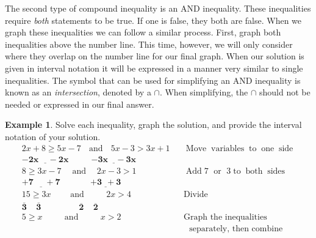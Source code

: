 \documentclass[12pt]{book}
\theoremstyle{definition}
\newtheorem{example}{Example}
\newcommand{\tmmathbf}[1]{\ensuremath{\boldsymbol{#1}}}
\newcommand{\tmop}[1]{\ensuremath{\operatorname{#1}}}
\begin{document}
The second type of compound inequality is an AND inequality. These inequalities require {\it both} statements to be true. If one is false, they both are false. When we graph these inequalities we can follow a similar process.  First, graph both inequalities above the number line.  This time, however, we will only consider where they overlap on the number line for our final graph.  When our solution is given in interval notation it will be expressed in a manner very similar to single inequalities.  The symbol that can be used for simplifying an AND inequality is known as an {\it intersection}, denoted by a $\cap$.  When simplifying, the $\cap$ should not be needed or expressed in our final answer.
\begin{example}\label{Lin101} Solve each inequality, graph the solution, and provide the interval notation of your solution.
  \begin{eqnarray*}
    2 x + 8 \geq 5 x - 7 \tmop{~~and~~} 5 x - 3 > 3 x + 1 &  & \tmop{Move}
    \tmop{variables} \tmop{to} \tmop{one} \tmop{side}\\
    \tmmathbf{\underline{- 2 x ~~~~~- 2 x}} ~~~~~~~~~~~~  \tmmathbf{\underline{- 3 x ~~~~- 3 x}}~~~~  &  & \\
    8 \geq 3 x - 7 \tmop{~~~and~~~} 2 x - 3 > 1~~~~~~ &  & \tmop{Add} 7 \tmop{~or~} 3
    \tmop{to} \tmop{both} \tmop{sides}\\
    \tmmathbf{\underline{+ 7 ~~~~~~+ 7}} ~~~~~~~~~~~~~~~~ \tmmathbf{\underline{+ 3 ~~+ 3}}~~~ &  & \\
    15 \geq 3 x \tmop{~~~~~~and~~~~~~~} 2 x > 4~~~~~~~ &  & \tmop{Divide}\\
    \tmmathbf{\overline{3} ~~~~~ \overline{3}} ~~~~~~~~~~~~~~~~~~~~ \tmmathbf{\overline{2} ~~~~~ \overline{2}}~~~~~~~ &  & \\
    5 \geq x \tmop{~~~~~~~and~~~~~~~} x > 2~~~~~~~~~ &  & \tmop{Graph~the~inequalities~}\\
		& & ~~~\tmop{separately,~then~combine}%
  \end{eqnarray*}
\end{example}
\end{document}
